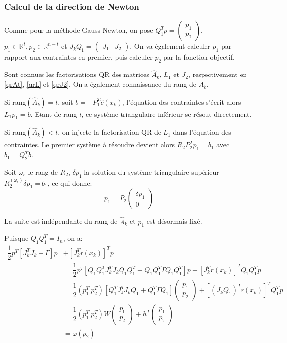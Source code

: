 \documentclass[a4paper,11pt]{article}
\newcommand{\ha}{\hat{A}}
\newcommand{\hc}{\hat{c}}
\numberwithin{equation}{section}
\begin{document}
\subsubsection{Calcul de la direction de Newton}

Comme pour la méthode Gauss-Newton, on pose $Q_1^Tp = \begin{pmatrix} p_1\\p_2\end{pmatrix}$, $p_1 \in \mathbb{R}^t, p_2 \in \mathbb{R}^{n-t}$ et $J_{k}Q_1 = \begin{pmatrix}J_1 & J_2 \end{pmatrix}$. On va également calculer $p_{1}$ par rapport aux contraintes en premier, puis calculer $p_{2}$ par la fonction objectif. 

Sont connues les factorisations QR des matrices $\ha_{k}$, $L_{1}$ et $J_{2}$, respectivement en \ref{qrAt}, \ref{qrL} et \ref{qrJ2}. On a également connaissance du rang de $\ha_{k}$.

Si rang$(\ha_{k})=t$, soit $b = -P_1^T\hc(x_{k})$, l'équation des contraintes s'écrit alors \\ $L_{1}p_1 = b$. Etant de rang $t$, ce système triangulaire inférieur se résout directement.

Si rang$(\ha_{k})<t$, on injecte la factorisation QR de $L_{1}$ dans l'équation des contraintes. Le premier système à résoudre devient alors $R_{2}P_2^Tp_1 = b_1$ avec $b_{1}=Q_{2}^{T}b$. 

Soit $\omega_{r}$ le rang de $R_{2}$, $\delta p_{1}$ la solution du système triangulaire supérieur $R_{2}^{(\omega_{r})}\delta p_{1} = b_{1}$, ce qui donne:
$$ p_{1} = P_{2} \begin{pmatrix} \delta p_{1} \\ 0 \end{pmatrix}$$

La suite est indépendante du rang de $\ha_{k}$ et $p_{1}$ est désormais fixé.

Puisque $Q_1Q_1^T = I_n$, on a:
\begin{align*} 
\dfrac{1}{2}p^T\left[J_{k}^TJ_{k} + \Gamma\right]p & + \left[J_{k}^Tr(x_{k})\right]^Tp \\ & = \dfrac{1}{2}p^T\left[Q_1Q_1^TJ_{k}^TJ_{k}Q_1Q_1^T + Q_1Q_1^T\Gamma Q_1Q_1^T\right]p + \left[J_{k}^Tr(x_{k})\right]^TQ_1Q_1^Tp \\
&= \dfrac{1}{2}(p_1^T\ p_2^T) \left[Q_1^TJ_{k}^TJ_{k}Q_1 + Q_1^T\Gamma Q_1\right]\begin{pmatrix} p_1 \\ p_2\end{pmatrix} + \left[(J_{k}Q_1)^Tr(x_{k})\right]^TQ_{1}^{T}p\\
&= \dfrac{1}{2}(p_1^T\ p_2^T)W\begin{pmatrix}p_1\\p_2\end{pmatrix} + h^T\begin{pmatrix}p_1\\p_2\end{pmatrix} \\
&= \varphi(p_2)
\end{align*}
\end{document}
